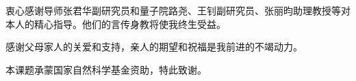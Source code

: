 
\begin{acknowledgements}
  衷心感谢导师张君华副研究员和量子院路尧、王钊副研究员、张丽昀助理教授等对本人的精心指导。他们的言传身教将使我终生受益。



  感谢父母家人的关爱和支持，亲人的期望和祝福是我前进的不竭动力。

  本课题承蒙国家自然科学基金资助，特此致谢。
\end{acknowledgements}
